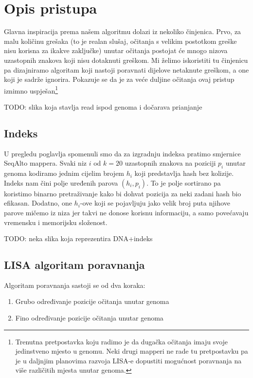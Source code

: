 \documentclass[times, utf8, diplomski]{fer}
\begin{document}
\section{Opis pristupa}

Glavna inspiracija prema našem algoritmu dolazi iz nekoliko činjenica. Prvo, za malu količinu grešaka (to je realan slušaj, očitanja s velikim postotkom greške nisu korisna za ikakve zaključke) unutar očitanja postojat će mnogo nizova uzastopnih znakova koji nisu dotaknuti greškom. Mi želimo iskoristiti tu činjenicu pa dizajniramo algoritam koji nastoji poravnati dijelove netaknute greškom, a one koji je sadrže ignorira. Pokazuje se da je za veće duljine očitanja ovaj pristup iznimno uspješan\footnote{Trenutna pretpostavka koju radimo je da dugačka očitanja imaju svoje jedinstveno mjesto u genomu. Neki drugi mapperi ne rade tu pretpostavku pa je u daljnjim planovima razvoja LISA-e dopustiti mogućnost poravnanja na više različitih mjesta unutar genoma.}

TODO: slika koja stavlja read ispod genoma i dočarava prianjanje

\subsection{Indeks}
U pregledu poglavlja spomenuli smo da za izgradnju indeksa pratimo smjernice SeqAlto mappera. Svaki niz $i$ od $k=20$ uzastopnih znakova na poziciji $p_i$ unutar genoma kodiramo jednim cijelim brojem $h_i$ koji predstavlja hash bez kolizije. Indeks nam čini polje uređenih parova $(h_i, p_i)$. To je polje sortirano pa koristimo binarno pretraživanje kako bi dohvat pozicija za neki zadani hash bio efikasan. Dodatno, one $h_i$-ove koji se pojavljuju jako velik broj puta njihove parove mičemo iz niza jer takvi ne donose korisnu informaciju, a samo povećavaju vremensku i memorijsku složenost. 

TODO: neka slika koja reprezentira DNA+indeks 

\subsection{LISA algoritam poravnanja}
Algoritam poravnanja sastoji se od dva koraka:
\begin{enumerate}
\item Grubo određivanje pozicije očitanja unutar genoma
\item Fino određivanje pozicije očitanja unutar genoma
\end{enumerate}
\end{document}
